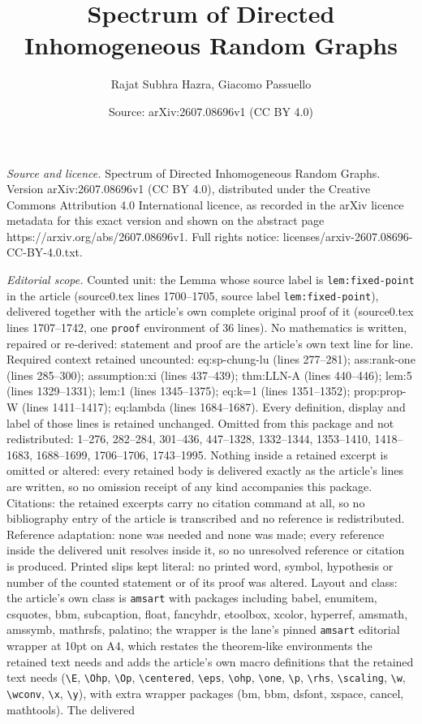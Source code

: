 \documentclass[10pt,a4paper]{amsart}
\title[Spectrum of Directed Inhomogeneous Random Graphs]{Spectrum of Directed Inhomogeneous Random Graphs}
\author{Rajat Subhra Hazra, Giacomo Passuello}
\date{Source: arXiv:2607.08696v1 (CC BY 4.0)}
\begin{document}
\maketitle

\noindent\emph{Source and licence.} Spectrum of Directed Inhomogeneous Random Graphs. Version arXiv:2607.08696v1 (CC BY 4.0), distributed under the Creative Commons Attribution 4.0 International licence, as recorded in the arXiv licence metadata for this exact version and shown on the abstract page https://arxiv.org/abs/2607.08696v1. Full rights notice: licenses/arxiv-2607.08696-CC-BY-4.0.txt.\par\smallskip

\noindent\textit{Editorial scope.} Counted unit: the Lemma whose source label is \texttt{lem:fixed-point} in the article (source0.tex lines 1700--1705, source label \texttt{lem:fixed-point}), delivered together with the article's own complete original proof of it (source0.tex lines 1707--1742, one \texttt{proof} environment of 36 lines). No mathematics is written, repaired or re-derived: statement and proof are the article's own text line for line. Required context retained uncounted: eq:sp-chung-lu (lines 277--281); ass:rank-one (lines 285--300); assumption:xi (lines 437--439); thm:LLN-A (lines 440--446); lem:5 (lines 1329--1331); lem:1 (lines 1345--1375); eq:k=1 (lines 1351--1352); prop:prop-W (lines 1411--1417); eq:lambda (lines 1684--1687). Every definition, display and label of those lines is retained unchanged. Omitted from this package and not redistributed: 1--276, 282--284, 301--436, 447--1328, 1332--1344, 1353--1410, 1418--1683, 1688--1699, 1706--1706, 1743--1995. Nothing inside a retained excerpt is omitted or altered: every retained body is delivered exactly as the article's lines are written, so no omission receipt of any kind accompanies this package. Citations: the retained excerpts carry no citation command at all, so no bibliography entry of the article is transcribed and no reference is redistributed. Reference adaptation: none was needed and none was made; every reference inside the delivered unit resolves inside it, so no unresolved reference or citation is produced. Printed slips kept literal: no printed word, symbol, hypothesis or number of the counted statement or of its proof was altered. Layout and class: the article's own class is \texttt{amsart} with packages including babel, enumitem, csquotes, bbm, subcaption, float, fancyhdr, etoolbox, xcolor, hyperref, amsmath, amssymb, mathrsfs, palatino; the wrapper is the lane's pinned \texttt{amsart} editorial wrapper at 10pt on A4, which restates the theorem-like environments the retained text needs and adds the article's own macro definitions that the retained text needs (\texttt{\textbackslash E}, \texttt{\textbackslash Ohp}, \texttt{\textbackslash Op}, \texttt{\textbackslash centered}, \texttt{\textbackslash eps}, \texttt{\textbackslash ohp}, \texttt{\textbackslash one}, \texttt{\textbackslash p}, \texttt{\textbackslash rhs}, \texttt{\textbackslash scaling}, \texttt{\textbackslash w}, \texttt{\textbackslash wconv}, \texttt{\textbackslash x}, \texttt{\textbackslash y}), with extra wrapper packages (bm, bbm, dsfont, xspace, cancel, mathtools). The delivered 
\end{document}
